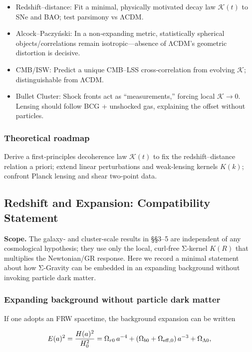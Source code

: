 \documentclass[11pt,a4paper]{article}
\begin{document}
\begin{itemize}
\item Redshift–distance: Fit a minimal, physically motivated decay law $\mathcal{K}(t)$ to SNe and BAO; test parsimony vs ΛCDM.
\item Alcock–Paczyński: In a non‑expanding metric, statistically spherical objects/correlations remain isotropic—absence of ΛCDM’s geometric distortion is decisive.
\item CMB/ISW: Predict a unique CMB–LSS cross‑correlation from evolving $\mathcal{K}$; distinguishable from ΛCDM.
\item Bullet Cluster: Shock fronts act as “measurements,” forcing local $\mathcal{K}\to0$. Lensing should follow BCG + unshocked gas, explaining the offset without particles.
\end{itemize}


\subsubsection{Theoretical roadmap}


Derive a first‑principles decoherence law $\mathcal{K}(t)$ to fix the redshift–distance relation a priori; extend linear perturbations and weak‑lensing kernels $K(k)$; confront Planck lensing and shear two‑point data.


\subsection{Redshift and Expansion: Compatibility Statement}


\textbf{Scope.} The galaxy‑ and cluster‑scale results in §§3–5 are independent of any cosmological hypothesis; they use only the local, curl‑free Σ‑kernel $K(R)$ that multiplies the Newtonian/GR response. Here we record a minimal statement about how Σ‑Gravity can be embedded in an expanding background without invoking particle dark matter.


\subsubsection{Expanding background without particle dark matter}


If one adopts an FRW spacetime, the background expansion can be written


\begin{equation}
E(a)^2 = \frac{H(a)^2}{H_0^2} = \Omega_{r0}\,a^{-4} + (\Omega_{b0} + \Omega_{\rm eff,0})\,a^{-3} + \Omega_{\Lambda 0},
\end{equation}
\end{document}
